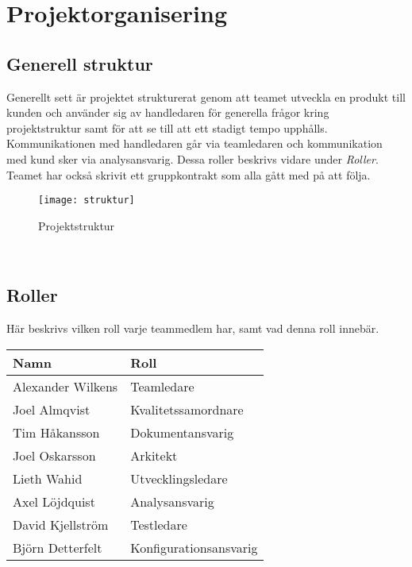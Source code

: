 \section{Projektorganisering}
\subsection{Generell struktur}
Generellt sett är projektet strukturerat genom att teamet utveckla en produkt till kunden och använder sig av
handledaren för generella frågor kring projektstruktur samt för att se till att ett stadigt tempo upphålls.
Kommunikationen med handledaren går via teamledaren och kommunikation med kund sker via analysansvarig. Dessa roller
beskrivs vidare under \textit{Roller}. Teamet har också skrivit ett gruppkontrakt\cite{bib-gruppkontrakt} som alla gått med på att följa.
\begin{figure}[t]
    \centering
    \texttt{[image: struktur]}
    \caption{Projektstruktur}
    \label{fig:struktur}
\end{figure}\\



\subsection{Roller}
Här beskrivs vilken roll varje teammedlem har, samt vad denna roll innebär.
\begin{center}
    \begin{tabular}{| l | l |}
        \hline
        \textbf{Namn} & \textbf{Roll} \\
        \hline
        \centering Alexander Wilkens & Teamledare\\
        \hline
        \centering Joel Almqvist & Kvalitetssamordnare\\
        \hline
        \centering Tim Håkansson & Dokumentansvarig\\
        \hline
        \centering Joel Oskarsson & Arkitekt\\
        \hline
        \centering Lieth Wahid & Utvecklingsledare\\
        \hline
        \centering Axel Löjdquist & Analysansvarig\\
        \hline
        \centering David Kjellström & Testledare\\
        \hline
        \centering Björn Detterfelt & Konfigurationsansvarig\\
        \hline
    \end{tabular}
\end{center}
